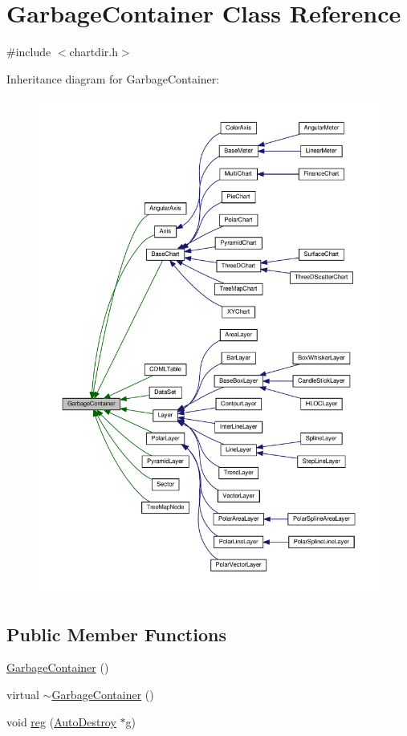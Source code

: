 \hypertarget{class_garbage_container}{}\section{Garbage\+Container Class Reference}
\label{class_garbage_container}


{\ttfamily \#include $<$chartdir.\+h$>$}



Inheritance diagram for Garbage\+Container\+:
\nopagebreak
\begin{figure}[H]
\begin{center}
\leavevmode
\includegraphics[width=350pt]{class_garbage_container__inherit__graph}
\end{center}
\end{figure}
\subsection*{Public Member Functions}
\begin{DoxyCompactItemize}
\item 
\hyperlink{class_garbage_container_a326a3f2d0770a301ea7d8bcd30d72d03}{Garbage\+Container} ()
\item 
virtual \hyperlink{class_garbage_container_aec9bd6ec3acc7352de624920716f6761}{$\sim$\+Garbage\+Container} ()
\item 
void \hyperlink{class_garbage_container_a5612b22ee7b0e0ac3a2f346b89535c33}{reg} (\hyperlink{class_auto_destroy}{Auto\+Destroy} $\ast$g)
\end{DoxyCompactItemize}



